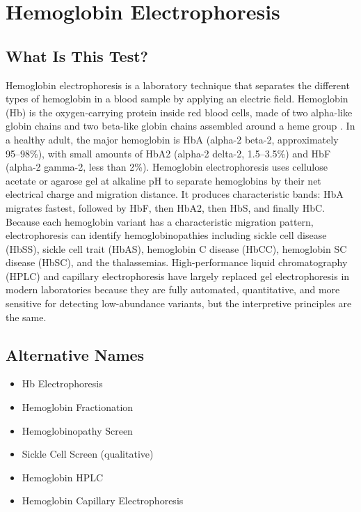 \chapter{Hemoglobin Electrophoresis}

\section*{What Is This Test?}
Hemoglobin electrophoresis is a laboratory technique that separates the different types of hemoglobin in a blood sample by applying an electric field. Hemoglobin (Hb) is the oxygen-carrying protein inside red blood cells, made of two alpha-like globin chains and two beta-like globin chains assembled around a heme group \cite{steinberg2009disorders}. In a healthy adult, the major hemoglobin is HbA (alpha-2 beta-2, approximately 95--98\%), with small amounts of HbA2 (alpha-2 delta-2, 1.5--3.5\%) and HbF (alpha-2 gamma-2, less than 2\%). Hemoglobin electrophoresis uses cellulose acetate or agarose gel at alkaline pH to separate hemoglobins by their net electrical charge and migration distance. It produces characteristic bands: HbA migrates fastest, followed by HbF, then HbA2, then HbS, and finally HbC. Because each hemoglobin variant has a characteristic migration pattern, electrophoresis can identify hemoglobinopathies including sickle cell disease (HbSS), sickle cell trait (HbAS), hemoglobin C disease (HbCC), hemoglobin SC disease (HbSC), and the thalassemias. High-performance liquid chromatography (HPLC) and capillary electrophoresis have largely replaced gel electrophoresis in modern laboratories because they are fully automated, quantitative, and more sensitive for detecting low-abundance variants, but the interpretive principles are the same.

\section*{Alternative Names}
\begin{itemize}
  \item Hb Electrophoresis
  \item Hemoglobin Fractionation
  \item Hemoglobinopathy Screen
  \item Sickle Cell Screen (qualitative)
  \item Hemoglobin HPLC
  \item Hemoglobin Capillary Electrophoresis
\end{itemize}
